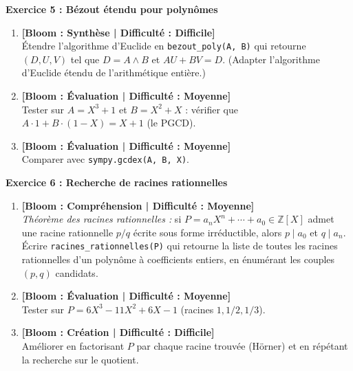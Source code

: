 \vspace{0.3cm}

\noindent\textbf{Exercice 5 : Bézout étendu pour polynômes}
\begin{enumerate}
    \item \textbf{[Bloom : Synthèse | Difficulté : Difficile]} \\
    Étendre l'algorithme d'Euclide en \texttt{bezout\_poly(A, B)} qui retourne $(D, U, V)$ tel que $D = A \wedge B$ et $A U + B V = D$. (Adapter l'algorithme d'Euclide étendu de l'arithmétique entière.)
    \item \textbf{[Bloom : Évaluation | Difficulté : Moyenne]} \\
    Tester sur $A = X^3 + 1$ et $B = X^2 + X$ : vérifier que $A \cdot 1 + B \cdot (1 - X) = X + 1$ (le PGCD).
    \item \textbf{[Bloom : Évaluation | Difficulté : Moyenne]} \\
    Comparer avec \texttt{sympy.gcdex(A, B, X)}.
\end{enumerate}

\vspace{0.3cm}

\noindent\textbf{Exercice 6 : Recherche de racines rationnelles}
\begin{enumerate}
    \item \textbf{[Bloom : Compréhension | Difficulté : Moyenne]} \\
    \emph{Théorème des racines rationnelles :} si $P = a_n X^n + \cdots + a_0 \in \mathbb{Z}[X]$ admet une racine rationnelle $p/q$ écrite sous forme irréductible, alors $p \mid a_0$ et $q \mid a_n$.
    Écrire \texttt{racines\_rationnelles(P)} qui retourne la liste de toutes les racines rationnelles d'un polynôme à coefficients entiers, en énumérant les couples $(p, q)$ candidats.
    \item \textbf{[Bloom : Évaluation | Difficulté : Moyenne]} \\
    Tester sur $P = 6X^3 - 11X^2 + 6X - 1$ (racines $1, 1/2, 1/3$).
    \item \textbf{[Bloom : Création | Difficulté : Difficile]} \\
    Améliorer en factorisant $P$ par chaque racine trouvée (Hörner) et en répétant la recherche sur le quotient.
\end{enumerate}

\vspace{0.3cm}

